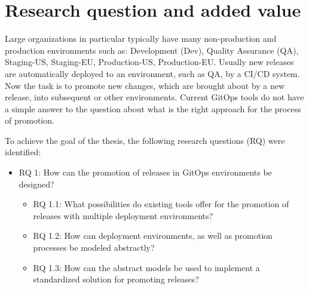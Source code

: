 \section{Research question and added value}
\label{introduction:research-question}


%
Large organizations in particular typically have many
non-production and production environments
such as:
Development (Dev),
Quality Assurance (QA),
Staging-US,
Staging-EU,
Production-US,
Production-EU.
Usually new releases are automatically deployed to an environment,
such as QA, 
by a CI/CD system.
Now the task is to promote
new changes, which are brought about by a new release,
into subsequent or other environments.
Current GitOps tools do not have a simple answer to
the question about what is the right approach for the process of promotion.
\bigskip


\noindent
To achieve the goal of the thesis, the following research questions (RQ) were identified:

\begin{itemize}
	\item RQ 1: How can the promotion of releases in GitOps environments be designed?
	\begin{itemize}
		\item RQ 1.1: What possibilities do existing tools offer for the promotion of releases with multiple deployment environments?
		\item RQ 1.2: How can deployment environments, as well as promotion processes be modeled abstractly?
		\item RQ 1.3: How can the abstract models be used to implement a standardized solution for promoting releases?
	\end{itemize}
\end{itemize}










